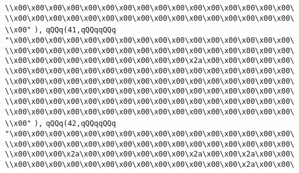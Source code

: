 \verb|\\x00\x00\x00\x00\x00\x00\x00\x00\x00\x00\x00\x00\x00\x00\x00\x00\|\newline
\verb|\\x00\x00\x00\x00\x00\x00\x00\x00\x00\x00\x00\x00\x00\x00\x00\x00\|\newline
\verb|\\x00"|\newline
\verb|),|\newline
\verb|qQQq(41,qQQqqQQq|\newline
\verb|"\x00\x00\x00\x00\x00\x00\x00\x00\x00\x00\x00\x00\x00\x00\x00\x00\|\newline
\verb|\\x00\x00\x00\x00\x00\x00\x00\x00\x00\x00\x00\x00\x00\x00\x00\x00\|\newline
\verb|\\x00\x00\x00\x00\x00\x00\x00\x00\x00\x00\x2a\x00\x00\x00\x00\x00\|\newline
\verb|\\x00\x00\x00\x00\x00\x00\x00\x00\x00\x00\x00\x00\x00\x00\x00\x00\|\newline
\verb|\\x00\x00\x00\x00\x00\x00\x00\x00\x00\x00\x00\x00\x00\x00\x00\x00\|\newline
\verb|\\x00\x00\x00\x00\x00\x00\x00\x00\x00\x00\x00\x00\x00\x00\x00\x00\|\newline
\verb|\\x00\x00\x00\x00\x00\x00\x00\x00\x00\x00\x00\x00\x00\x00\x00\x00\|\newline
\verb|\\x00\x00\x00\x00\x00\x00\x00\x00\x00\x00\x00\x00\x00\x00\x00\x00\|\newline
\verb|\\x00"|\newline
\verb|),|\newline
\verb|qQQq(42,qQQqqQQq|\newline
\verb|"\x00\x00\x00\x00\x00\x00\x00\x00\x00\x00\x00\x00\x00\x00\x00\x00\|\newline
\verb|\\x00\x00\x00\x00\x00\x00\x00\x00\x00\x00\x00\x00\x00\x00\x00\x00\|\newline
\verb|\\x00\x00\x00\x2a\x00\x00\x00\x00\x00\x00\x2a\x00\x00\x2a\x00\x00\|\newline
\verb|\\x00\x00\x00\x00\x00\x00\x00\x00\x00\x00\x00\x00\x00\x2a\x00\x00\|\newline
